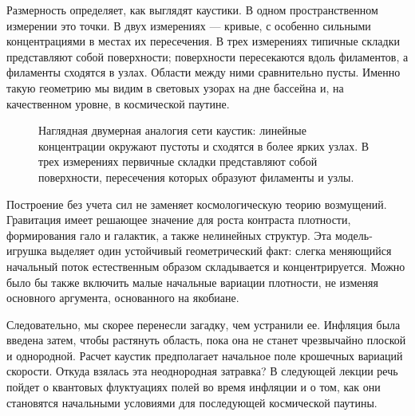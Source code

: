 Размерность определяет, как выглядят каустики. В одном пространственном измерении это точки. В двух измерениях — кривые, с особенно сильными концентрациями в местах их пересечения. В трех измерениях типичные складки представляют собой поверхности; поверхности пересекаются вдоль филаментов, а филаменты сходятся в узлах. Области между ними сравнительно пусты. Именно такую геометрию мы видим в световых узорах на дне бассейна и, на качественном уровне, в космической паутине.

\begin{figure}[htbp]
\centering
{}
\caption{Наглядная двумерная аналогия сети каустик: линейные концентрации окружают пустоты и сходятся в более ярких узлах. В трех измерениях первичные складки представляют собой поверхности, пересечения которых образуют филаменты и узлы.}
\label{fig:c09-caustic-network}
\end{figure}

Построение без учета сил не заменяет космологическую теорию возмущений. Гравитация имеет решающее значение для роста контраста плотности, формирования гало и галактик, а также нелинейных структур. Эта модель-игрушка выделяет один устойчивый геометрический факт: слегка меняющийся начальный поток естественным образом складывается и концентрируется. Можно было бы также включить малые начальные вариации плотности, не изменяя основного аргумента, основанного на якобиане.

Следовательно, мы скорее перенесли загадку, чем устранили ее. Инфляция была введена затем, чтобы растянуть область, пока она не станет чрезвычайно плоской и однородной. Расчет каустик предполагает начальное поле крошечных вариаций скорости. Откуда взялась эта неоднородная затравка? В следующей лекции речь пойдет о квантовых флуктуациях полей во время инфляции и о том, как они становятся начальными условиями для последующей космической паутины.

